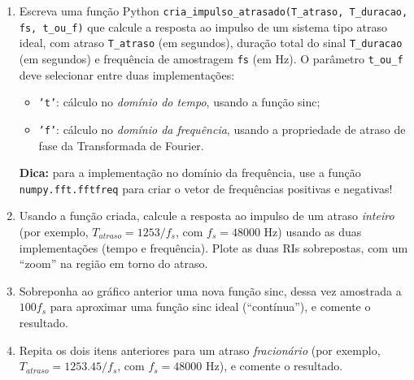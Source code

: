 \documentclass[a4paper,twoside,12pt]{article}
\begin{document}
	\begin{enumerate}
		\item Escreva uma função Python \texttt{cria\_impulso\_atrasado(T\_atraso, T\_duracao, fs, t\_ou\_f)} que calcule a resposta ao impulso de um sistema tipo atraso ideal, com atraso \texttt{T\_atraso} (em segundos), duração total do sinal \texttt{T\_duracao} (em segundos) e frequência de amostragem \texttt{fs} (em Hz). O parâmetro \texttt{t\_ou\_f} deve selecionar entre duas implementações:
		\begin{itemize}
			\item \texttt{'t'}: cálculo no \emph{domínio do tempo}, usando a função sinc;
			\item \texttt{'f'}: cálculo no \emph{domínio da frequência}, usando a propriedade de atraso de fase da Transformada de Fourier.
		\end{itemize}
		
		\textbf{Dica:} para a implementação no domínio da frequência, use a função \texttt{numpy.fft.fftfreq} para criar o vetor de frequências positivas e negativas!
		
		\item Usando a função criada, calcule a resposta ao impulso de um atraso \emph{inteiro} (por exemplo, $T_{atraso} = 1253 / f_s$, com $f_s=48000$ Hz) usando as duas implementações (tempo e frequência). Plote as duas RIs sobrepostas, com um ``zoom'' na região em torno do atraso.
		
		\item Sobreponha ao gráfico anterior uma nova função sinc, dessa vez amostrada a $100 f_s$ para aproximar uma função sinc ideal (``contínua''), e comente o resultado.
		
		\item Repita os dois itens anteriores para um atraso \emph{fracionário} (por exemplo, $T_{atraso} = 1253.45/f_s$, com $f_s = 48000$ Hz), e comente o resultado.
		
	\end{enumerate}
	
\end{document}
